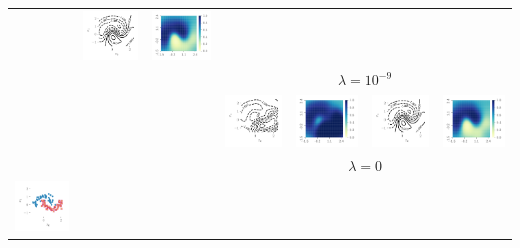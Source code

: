 \documentclass{article}
\theoremstyle{definition}
\begin{document}
\begin{table}
\begin{tabular}{@{}c@{}c@{}c@{}c@{}c@{}c@{}c@{}}
&
\includegraphics[trim={7mm 8mm 3mm 3mm}, clip,height=0.13\textwidth]{img/moon/moon_rm_40_elbo_meanf_1e-09.pdf}
&
\includegraphics[height=0.13\textwidth]{img/moon/moon_rm_40_elbo_prob_1e-09.pdf}
\\
& & &
\multicolumn{4}{c}{$\lambda = 10^{-9}$}
\\
& & &
\includegraphics[trim={7mm 8mm 3mm 3mm}, clip,height=0.13\textwidth]{img/moon/moon_rm_40_eubo_meanf_0_0.pdf}
&
\includegraphics[height=0.13\textwidth]{img/moon/moon_rm_40_eubo_prob_0_0.pdf}
&
\includegraphics[trim={7mm 8mm 3mm 3mm}, clip,height=0.13\textwidth]{img/moon/moon_rm_40_elbo_meanf_0_0.pdf}
&
\includegraphics[height=0.13\textwidth]{img/moon/moon_rm_40_elbo_prob_0_0.pdf}
\\
& & & 
\multicolumn{4}{c}{$\lambda = 0$}\\
\midrule
\multirow[t]{4}{*}{
    \includegraphics[trim={0mm 0mm 3mm 3mm}, clip,height=0.13\textwidth]{img/moon/moon_rm_50_data.pdf}
}
\end{tabular}
\end{table}
\end{document}
